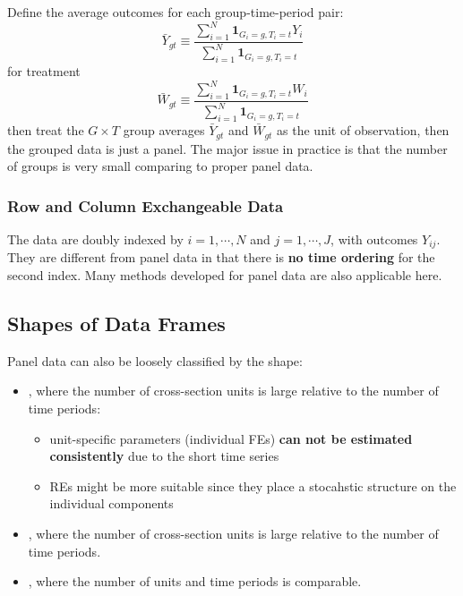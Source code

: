 \documentclass[twoside]{article}
\begin{document}
Define the average outcomes for each group-time-period pair:
\begin{equation*}
    \bar{Y}_{gt} \equiv \frac{\sum^N_{i=1} \mathbf{1}_{G_i=g,T_i=t}Y_i}{\sum^N_{i=1} \mathbf{1}_{G_i=g,T_i=t}}
\end{equation*}
for treatment 
\begin{equation*}
    \bar{W}_{gt} \equiv \frac{\sum^N_{i=1} \mathbf{1}_{G_i=g,T_i=t}W_i}{\sum^N_{i=1} \mathbf{1}_{G_i=g,T_i=t}}
\end{equation*}
then treat the $G\times T$ group averages $\bar{Y}_{gt}$ and $\bar{W}_{gt}$ as the unit of observation, then the grouped data is just a panel.
The major issue in practice is that the number of groups is very small comparing to proper panel data.

\subsubsection{Row and Column Exchangeable Data}
The data are doubly indexed by $i=1,\cdots,N$ and $j=1,\cdots,J$, with outcomes $Y_{ij}$. They are different from panel data in that there is \textbf{no time ordering} for the second index. Many methods developed for panel data are also applicable here.

\subsection{Shapes of Data Frames}
Panel data can also be loosely classified by the shape:
\begin{itemize}
    \item {}, where the number of cross-section units is large relative to the number of time periods:
    \begin{itemize}
        \item unit-specific parameters (individual FEs) \textbf{can not be estimated consistently} due to the short time series
        \item REs might be more suitable since they place a stocahstic structure on the individual components
    \end{itemize}
    \item {}, where the number of cross-section units is large relative to the number of time periods.
    \item {}, where the number of units and time periods is comparable.
\end{itemize}
\end{document}
